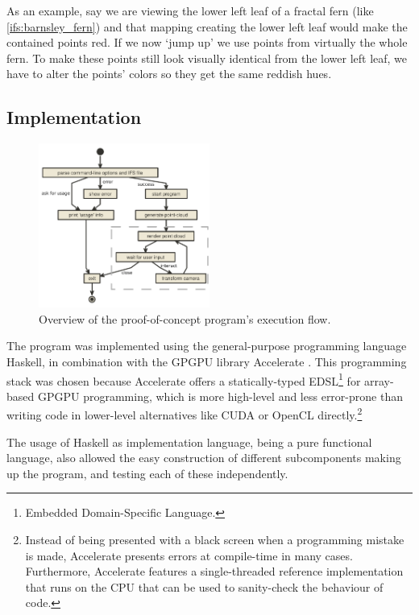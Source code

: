 \documentclass[11pt]{article}
\begin{document}
As an example, say we are viewing the lower left leaf of a fractal fern (like \autoref{ifs:barnsley_fern}) and that mapping creating the lower left leaf would make the contained points red. 
If we now `jump up' we use points from virtually the whole fern.
To make these points still look visually identical from the lower left leaf, we have to alter the points' colors so they get the same reddish hues.

\subsection{Implementation}
\label{sec:org0ad68f8}

\begin{figure}
  \centering
  \includegraphics[width=0.5\textwidth]{figures/program_execution}
  \caption{Overview of the proof-of-concept program's execution flow.}
\label{figure:program_flow}
\end{figure}

The program was implemented using the general-purpose programming language Haskell, 
in combination with the GPGPU library Accelerate \cite{chakravarty2011accelerating}.
This programming stack was chosen because Accelerate 
offers a statically-typed EDSL\footnote{Embedded Domain-Specific Language.} for array-based GPGPU programming,
which is more high-level and less error-prone than writing code 
in lower-level alternatives like CUDA or OpenCL directly.\footnote{Instead of being presented with a black screen when a programming mistake is made, 
Accelerate presents errors at compile-time in many cases. Furthermore, Accelerate features a
single-threaded reference implementation that runs on the CPU that can be used to sanity-check the behaviour of code.}

The usage of Haskell as implementation language, being a pure functional language, also allowed 
the easy construction of different subcomponents making up the program,
and testing each of these independently.
\end{document}
